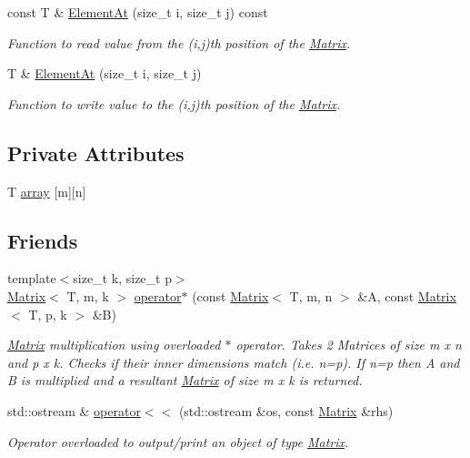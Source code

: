 \begin{DoxyCompactItemize}
const T \& \hyperlink{classMATOPS_1_1Matrix_a9eabd6b452bd01040c9ecaadc2ad6562}{Element\+At} (size\+\_\+t i, size\+\_\+t j) const
\begin{DoxyCompactList}\small\item\em Function to read value from the (i,j)th position of the \hyperlink{classMATOPS_1_1Matrix}{Matrix}. \end{DoxyCompactList}\item 
T \& \hyperlink{classMATOPS_1_1Matrix_a28edfa65a7b0f5cbeb96d91bfaee4d6a}{Element\+At} (size\+\_\+t i, size\+\_\+t j)
\begin{DoxyCompactList}\small\item\em Function to write value to the (i,j)th position of the \hyperlink{classMATOPS_1_1Matrix}{Matrix}. \end{DoxyCompactList}\end{DoxyCompactItemize}
\subsection*{Private Attributes}
\begin{DoxyCompactItemize}
\item 
T \hyperlink{classMATOPS_1_1Matrix_af2a995c9d251f109d54040e2732a93f0}{array} \mbox{[}m\mbox{]}\mbox{[}n\mbox{]}
\end{DoxyCompactItemize}
\subsection*{Friends}
\begin{DoxyCompactItemize}
\item 
{\footnotesize template$<$size\+\_\+t k, size\+\_\+t p$>$ }\\\hyperlink{classMATOPS_1_1Matrix}{Matrix}$<$ T, m, k $>$ \hyperlink{classMATOPS_1_1Matrix_a71a095944f9f8db8ac68b41e3a409114}{operator$\ast$} (const \hyperlink{classMATOPS_1_1Matrix}{Matrix}$<$ T, m, n $>$ \&A, const \hyperlink{classMATOPS_1_1Matrix}{Matrix}$<$ T, p, k $>$ \&B)
\begin{DoxyCompactList}\small\item\em \hyperlink{classMATOPS_1_1Matrix}{Matrix} multiplication using overloaded $\ast$ operator. Takes 2 Matrices of size m x n and p x k. Checks if their inner dimensions match (i.\+e. n=p). If n=p then A and B is multiplied and a resultant \hyperlink{classMATOPS_1_1Matrix}{Matrix} of size m x k is returned. \end{DoxyCompactList}\item 
std\+::ostream \& \hyperlink{classMATOPS_1_1Matrix_ae239bcfdd34ba0b3693e1c11063afc6a}{operator$<$$<$} (std\+::ostream \&os, const \hyperlink{classMATOPS_1_1Matrix}{Matrix} \&rhs)
\begin{DoxyCompactList}\small\item\em Operator overloaded to output/print an object of type \hyperlink{classMATOPS_1_1Matrix}{Matrix}. \end{DoxyCompactList}\end{DoxyCompactItemize}


